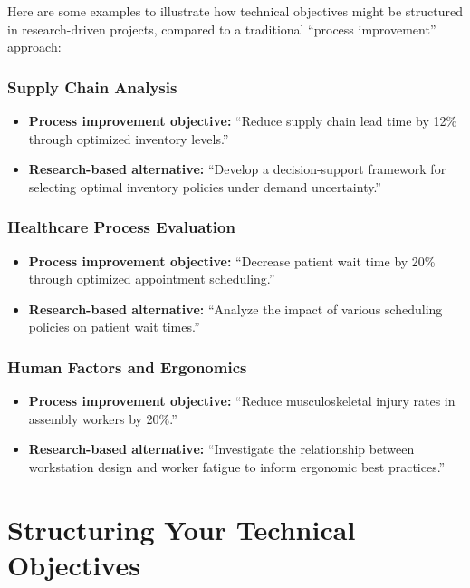 \documentclass[12pt]{article}
\begin{document}
Here are some examples to illustrate how technical objectives might be structured in research-driven projects, compared to a traditional ``process improvement'' approach:

\subsubsection*{Supply Chain Analysis}
\begin{itemize}[leftmargin=1.5cm]
    \item \textbf{Process improvement objective:} ``Reduce supply chain lead time by 12\% through optimized inventory levels.''
    \item \textbf{Research-based alternative:} ``Develop a decision-support framework for selecting optimal inventory policies under demand uncertainty.''
\end{itemize}

\subsubsection*{Healthcare Process Evaluation}
\begin{itemize}[leftmargin=1.5cm]
    \item \textbf{Process improvement objective:} ``Decrease patient wait time by 20\% through optimized appointment scheduling.''
    \item \textbf{Research-based alternative:} ``Analyze the impact of various scheduling policies on patient wait times.''
\end{itemize}

\subsubsection*{Human Factors and Ergonomics}
\begin{itemize}[leftmargin=1.5cm]
    \item \textbf{Process improvement objective:} ``Reduce musculoskeletal injury rates in assembly workers by 20\%.''
    \item \textbf{Research-based alternative:} ``Investigate the relationship between workstation design and worker fatigue to inform ergonomic best practices.''
\end{itemize}

\section*{Structuring Your Technical Objectives}
\end{document}
